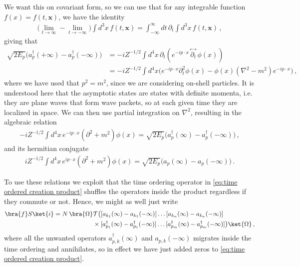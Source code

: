 We want this on covariant form, so we can use that for any integrable function $f(x)=f(t,\mathbf{x})$, we have the identity
\begin{align}
    \big(\lim_{t\to\infty}-\lim_{t\to-\infty}\big)\int d^{3}x\,f(t,\mathbf{x})=\int_{-\infty}^{\infty}dt\,\partial_{t}\int d^{3}x\,f(t,\mathbf{x})\,,
\end{align}
giving that 
\begin{align}
    \sqrt{2E_{p}}\big(a_{p}^{\dagger}(+\infty)-a_{p}^{\dagger}(-\infty)\big)&=-iZ^{-1/2}\int d^{4}x\,\partial_{t}(e^{-ip\cdot x}\,\overset{\leftrightarrow}{\partial_{t}}\,\phi(x))\nonumber
    \\
    &=-iZ^{-1/2}\int d^{4}x\big(e^{-ip\cdot x}\partial_{t}^{2}\phi(x)-\phi(x)(\nabla^{2}-m^{2})e^{-ip\cdot x}\big)\,,
\end{align}
where we have used that $p^{2}=m^{2}$, since we are considering on-shell particles. It is understood here that the asymptotic states are states with definite momenta, i.e. they are plane waves that form wave packets, so at each given time they are localized in space. We can then use partial integration on $\nabla^{2}$, resulting in the algebraic relation
\begin{align}
    -iZ^{-1/2}\int d^{4}x\,e^{-ip\cdot x}(\partial^{2}+m^{2})\phi(x)=\sqrt{2E_{p}}\big(a_{p}^{\dagger}(\infty)-a_{p}^{\dagger}(-\infty)\big)\,,\label{eq:RELATION one}
\end{align}
and its hermitian conjugate
\begin{align}
    iZ^{-1/2}\int d^{4}x\,e^{ip\cdot x}(\partial^{2}+m^{2})\phi(x)=\sqrt{2E_{p}}\big(a_{p}(\infty)-a_{p}(-\infty)\big)\,.\label{eq:RELATION two}
\end{align}

To use these relations we exploit that the time ordering operator in \cref{eq:time ordered creation product} shuffles the operators inside the product regardless if they commute or not. Hence, we might as well just write
\begin{align}
    \bra{f}S\ket{i}=N\,\bra{\Omega}&\mathcal{T}\big([a_{k_1}(\infty)-a_{k_1}(-\infty)]\dots[a_{k_n}(\infty)-a_{k_n}(-\infty)]\nonumber
    \\&\times[a_{p_1}^{\dagger}(\infty)-a_{p_1}^{\dagger}(-\infty)]\dots[a_{p_m}^{\dagger}(\infty)-a_{p_m}^{\dagger}(-\infty)]\big)\ket{\Omega}\,,
\end{align}
where all the unwanted operators $a_{p,k}^{\dagger}(\infty)$ and $a_{p,k}(-\infty)$ migrates inside the time ordering and annihilates, so in effect we have just added zeros to \cref{eq:time ordered creation product}. 

